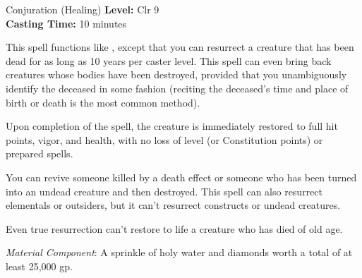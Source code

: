 {Conjuration (Healing)}
{
	\textbf{Level:}
	Clr 9\\
	\textbf{Casting Time:}
	10 minutes\\
}
{
	This spell functions like , except that you can resurrect a creature that has been dead for as long as 10 years per caster level. This spell can even bring back creatures whose bodies have been destroyed, provided that you unambiguously identify the deceased in some fashion (reciting the deceased's time and place of birth or death is the most common method).

	Upon completion of the spell, the creature is immediately restored to full hit points, vigor, and health, with no loss of level (or Constitution points) or prepared spells.

	You can revive someone killed by a death effect or someone who has been turned into an undead creature and then destroyed. This spell can also resurrect elementals or outsiders, but it can't resurrect constructs or undead creatures.

	Even true resurrection can't restore to life a creature who has died of old age.

	\textit{Material Component}:
	A sprinkle of holy water and diamonds worth a total of at least 25,000 gp.

}
